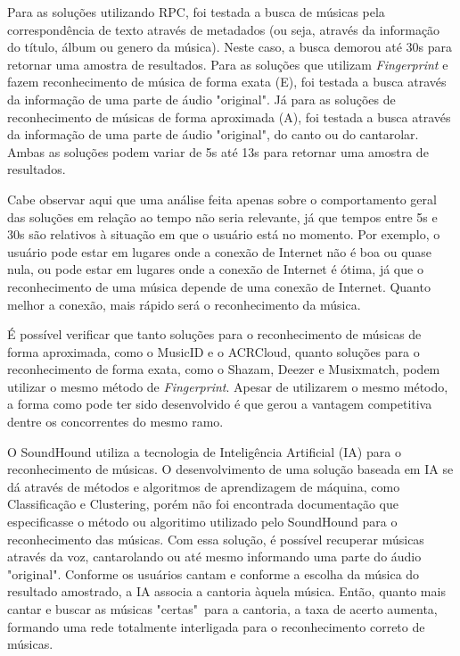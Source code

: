 Para as soluções utilizando RPC, foi testada a busca de músicas pela correspondência de texto através de metadados (ou seja, através da informação do título, álbum ou genero da música). Neste caso, a busca demorou até 30s para retornar uma amostra de resultados. Para as soluções que utilizam \textit{Fingerprint} e fazem reconhecimento de música de forma exata (E), foi testada a busca através da informação de uma parte de áudio "original". Já para as soluções de reconhecimento de músicas de forma aproximada (A), foi testada a busca através da informação de uma parte de áudio "original", do canto ou do cantarolar. Ambas as soluções podem variar de 5s até 13s para retornar uma amostra de resultados.

Cabe observar aqui que uma análise feita apenas sobre o comportamento geral das soluções em relação ao tempo não seria relevante, já que tempos entre 5s e 30s são relativos à situação em que o usuário está no momento. Por exemplo, o usuário pode estar em lugares onde a conexão de Internet não é boa ou quase nula, ou pode estar em lugares onde a conexão de Internet é ótima, já que o reconhecimento de uma música depende de uma conexão de Internet. Quanto melhor a conexão, mais rápido será o reconhecimento da música.

É possível verificar que tanto soluções para o reconhecimento de músicas de forma aproximada, como o MusicID e o ACRCloud, quanto soluções para o reconhecimento de forma exata, como o Shazam, Deezer e Musixmatch, podem utilizar o mesmo método de \textit{Fingerprint}. Apesar de utilizarem o mesmo método, a forma como pode ter sido desenvolvido é que gerou a vantagem competitiva dentre os concorrentes do mesmo ramo.

O SoundHound utiliza a tecnologia de Inteligência Artificial (IA) para o reconhecimento de músicas. O desenvolvimento de uma solução baseada em IA se dá através de métodos e algoritmos de aprendizagem de máquina, como Classificação e Clustering, porém não foi encontrada documentação que especificasse o método ou algoritimo utilizado pelo SoundHound para o reconhecimento das músicas. Com essa solução, é possível recuperar músicas através da voz, cantarolando ou até mesmo informando uma parte do áudio "original". Conforme os usuários cantam e conforme a escolha da música do resultado amostrado, a IA associa a cantoria àquela música. Então, quanto mais cantar e buscar as músicas "certas"\ para a cantoria, a taxa de acerto aumenta, formando uma rede totalmente interligada para o reconhecimento correto de músicas.

